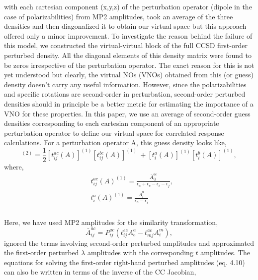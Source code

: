 with each cartesian component (x,y,z) of the perturbation operator (dipole in the case of polarizabilities)
from MP2 amplitudes, took an average of the three densities and then diagonalized it to obtain our 
virtual space but this approach offered only a minor improvement\cite{}.
To investigate the reason behind the failure of this model, we constructed the virtual-virtual
block of the full CCSD first-order perturbed density. All the diagonal elements of this density 
matrix were found to be zeros irrespective of the perturbation operator. The exact reason for this
is not yet understood but clearly, the virtual NOs (VNOs) obtained from this (or guess) density 
doesn't carry any useful information. However, since the polarizabilities and specific rotations are 
second-order in perturbation, second-order perturbed densities should in principle be a better 
metric for estimating the importance of a VNO for these properties.
In this paper, we use an average of second-order guess densities corresponding to each cartesian
component of an appropriate perturbation operator to define our virtual space 
for correlated response calculations. For a perturbation operator A, this guess density looks like,
\\
\begin{equation}
[{D^A_{ab}}]^{(2)} = \frac{1}{2}[t^{ac}_{ij}(A)]^{(1)}[t^{bc}_{ij}(A)]^{(1)} \
+ [t^{a}_{i}(A)]^{(1)} [t^{b}_{i}(A)]^{(1)}, 
\end{equation}
where,
\begin{equation}
\begin{split}
& t^{ac}_{ij}(A)^{(1)} = \frac{\bar{A}^{ac}_{ij}}{\epsilon_a + \epsilon_c - \epsilon_i - \epsilon_j},\\
& t^{a}_{i}(A)^{(1)} = \frac{\bar{A}^{a}_{i}}{\epsilon_a - \epsilon_i}\\
\end{split}
\end{equation}
\\
Here, we have used MP2 amplitudes for the similarity transformation,
\begin{equation}
\bar{A}^{ac}_{ij} = P_{ij}^{ac}(t^{ec}_{ij}A^a_e - t^{ac}_{mj}A^m_i) ,
\end{equation}
ignored the terms involving second-order perturbed amplitudes and 
approximated the first-order perturbed $\lambda$ amplitudes with the 
corresponding $t$ amplitudes. The equations for solving the first-order 
right-hand perturbed amplitudes (eq. 4.10) can also be written in terms
of the inverse of the CC Jacobian,
\\
